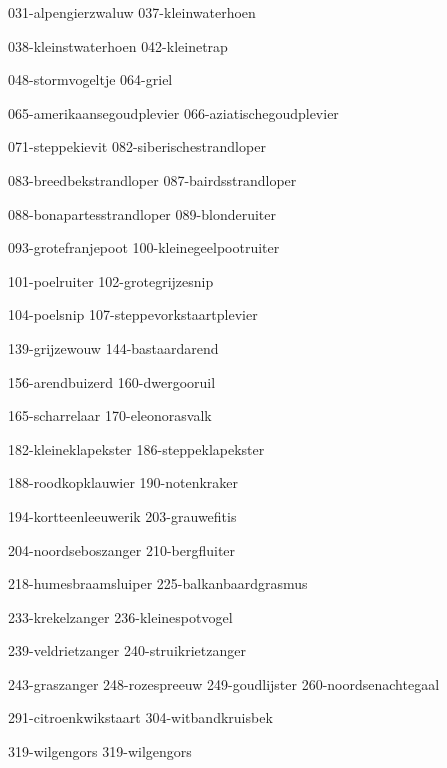 \begin{figure*}[h!]
    \centering
    \subfig
    {031-alpengierzwaluw}
    {037-kleinwaterhoen}

    \subfig
    {038-kleinstwaterhoen}
    {042-kleinetrap}

    \subfig
    {048-stormvogeltje}
    {064-griel}

    \subfig
    {065-amerikaansegoudplevier}
    {066-aziatischegoudplevier}
    
    \subfig
    {071-steppekievit}
    {082-siberischestrandloper}

    \subfig
    {083-breedbekstrandloper}
    {087-bairdsstrandloper}
\end{figure*}


\begin{figure*}[h!]
    \centering
    \subfig
    {088-bonapartesstrandloper}
    {089-blonderuiter}

    \subfig
    {093-grotefranjepoot}
    {100-kleinegeelpootruiter}

    \subfig
    {101-poelruiter}
    {102-grotegrijzesnip}

    \subfig
    {104-poelsnip}
    {107-steppevorkstaartplevier}

    \subfig
    {139-grijzewouw}
    {144-bastaardarend}

    \subfig
    {156-arendbuizerd}
    {160-dwergooruil}
\end{figure*}

\begin{figure*}[h!]
    \centering
    \subfig
    {165-scharrelaar}
    {170-eleonorasvalk}

    \subfig
    {182-kleineklapekster}
    {186-steppeklapekster}

    \subfig
    {188-roodkopklauwier}
    {190-notenkraker}

    \subfig
    {194-kortteenleeuwerik}
    {203-grauwefitis}

    \subfig
    {204-noordseboszanger}
    {210-bergfluiter}

    \subfig
    {218-humesbraamsluiper}
    {225-balkanbaardgrasmus}
\end{figure*}

\begin{figure*}[h!]
    \centering
    \subfig
    {233-krekelzanger}
    {236-kleinespotvogel}
    
    \subfig
    {239-veldrietzanger}
    {240-struikrietzanger}

    \subfig
    {243-graszanger}
    {248-rozespreeuw}
    \subfig
    {249-goudlijster}
    {260-noordsenachtegaal}

    \subfig
    {291-citroenkwikstaart}
    {304-witbandkruisbek}

    \subfig
    {319-wilgengors}
    {319-wilgengors}
\end{figure*}
